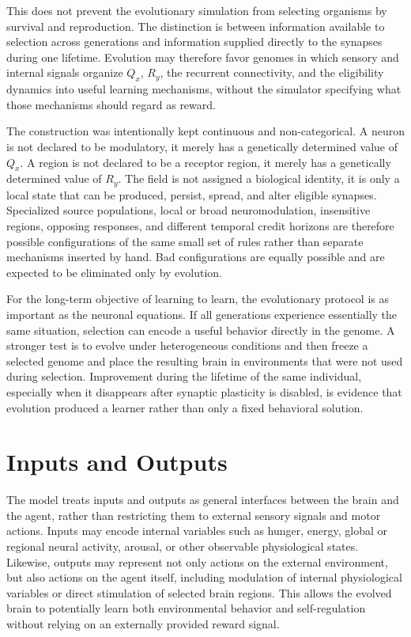 \documentclass[12pt,a4paper]{article}
\begin{document}
	This does not prevent the evolutionary simulation from selecting organisms by survival and reproduction. The distinction is between information available to selection across generations and information supplied directly to the synapses during one lifetime. Evolution may therefore favor genomes in which sensory and internal signals organize $Q_x$, $R_y$, the recurrent connectivity, and the eligibility dynamics into useful learning mechanisms, without the simulator specifying what those mechanisms should regard as reward.

	The construction was intentionally kept continuous and non-categorical. A neuron is not declared to be modulatory, it merely has a genetically determined value of $Q_x$. A region is not declared to be a receptor region, it merely has a genetically determined value of $R_y$. The field is not assigned a biological identity, it is only a local state that can be produced, persist, spread, and alter eligible synapses. Specialized source populations, local or broad neuromodulation, insensitive regions, opposing responses, and different temporal credit horizons are therefore possible configurations of the same small set of rules rather than separate mechanisms inserted by hand. Bad configurations are equally possible and are expected to be eliminated only by evolution.

	For the long-term objective of learning to learn, the evolutionary protocol is as important as the neuronal equations. If all generations experience essentially the same situation, selection can encode a useful behavior directly in the genome. A stronger test is to evolve under heterogeneous conditions and then freeze a selected genome and place the resulting brain in environments that were not used during selection. Improvement during the lifetime of the same individual, especially when it disappears after synaptic plasticity is disabled, is evidence that evolution produced a learner rather than only a fixed behavioral solution.

\section{Inputs and Outputs}
	The model treats inputs and outputs as general interfaces between the brain and the agent, rather than restricting them to external sensory signals and motor actions. Inputs may encode internal variables such as hunger, energy, global or regional neural activity, arousal, or other observable physiological states. Likewise, outputs may represent not only actions on the external environment, but also actions on the agent itself, including modulation of internal physiological variables or direct stimulation of selected brain regions. This allows the evolved brain to potentially learn both environmental behavior and self-regulation without relying on an externally provided reward signal. 
	
\end{document}
